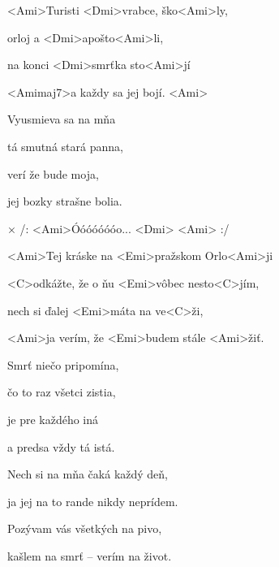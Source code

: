 
\zs
<Ami>Turisti <Dmi>vrabce, ško<Ami>ly,

orloj a <Dmi>apošto<Ami>li,

na konci <Dmi>smrťka sto<Ami>jí

<Amimaj7>a každy sa jej bojí. <Ami>
\ks

\zs
Vyusmieva sa na mňa

tá smutná stará panna,

verí že bude moja,

jej bozky strašne bolia.
\ks

× /: <Ami>Óóóóóóóo... <Dmi> <Ami> :/

<Ami>Tej kráske na <Emi>pražskom Orlo<Ami>ji

<C>odkážte, že o ňu <Emi>vôbec nesto<C>jím,

nech si ďalej <Emi>máta na ve<C>ži,

<Ami>ja verím, že <Emi>budem stále <Ami>žiť.
\kr

\zs
Smrť niečo pripomína,

čo to raz všetci zistia,

je pre každého iná

a predsa vždy tá istá.
\ks

\zr \kr

\zr
Nech si na mňa čaká každý deň,

ja jej na to rande nikdy neprídem.

Pozývam vás všetkých na pivo,

kašlem na smrť -- verím na život.
\kr

\kp
